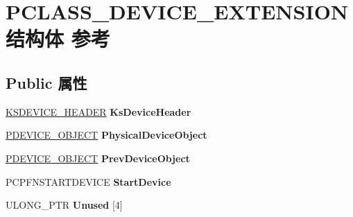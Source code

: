 \hypertarget{struct_p_c_l_a_s_s___d_e_v_i_c_e___e_x_t_e_n_s_i_o_n}{}\section{P\+C\+L\+A\+S\+S\+\_\+\+D\+E\+V\+I\+C\+E\+\_\+\+E\+X\+T\+E\+N\+S\+I\+O\+N结构体 参考}
\label{struct_p_c_l_a_s_s___d_e_v_i_c_e___e_x_t_e_n_s_i_o_n}
\subsection*{Public 属性}
\begin{DoxyCompactItemize}
\item 
\mbox{\label{struct_p_c_l_a_s_s___d_e_v_i_c_e___e_x_t_e_n_s_i_o_n_a088d32e2187f671bfe5e1c3013eb275b}} 
\hyperlink{interfacevoid}{K\+S\+D\+E\+V\+I\+C\+E\+\_\+\+H\+E\+A\+D\+ER} {\bfseries Ks\+Device\+Header}
\item 
\mbox{\label{struct_p_c_l_a_s_s___d_e_v_i_c_e___e_x_t_e_n_s_i_o_n_a1d6776c153eeffa6d287fc9c3e2117b2}} 
\hyperlink{struct___d_e_v_i_c_e___o_b_j_e_c_t}{P\+D\+E\+V\+I\+C\+E\+\_\+\+O\+B\+J\+E\+CT} {\bfseries Physical\+Device\+Object}
\item 
\mbox{\label{struct_p_c_l_a_s_s___d_e_v_i_c_e___e_x_t_e_n_s_i_o_n_a4721b969e8e48dedfc5940150492cd50}} 
\hyperlink{struct___d_e_v_i_c_e___o_b_j_e_c_t}{P\+D\+E\+V\+I\+C\+E\+\_\+\+O\+B\+J\+E\+CT} {\bfseries Prev\+Device\+Object}
\item 
\mbox{\label{struct_p_c_l_a_s_s___d_e_v_i_c_e___e_x_t_e_n_s_i_o_n_ad57a5bb8c016d4282b91305ea8607515}} 
P\+C\+P\+F\+N\+S\+T\+A\+R\+T\+D\+E\+V\+I\+CE {\bfseries Start\+Device}
\item 
\mbox{\label{struct_p_c_l_a_s_s___d_e_v_i_c_e___e_x_t_e_n_s_i_o_n_a51281e194edf4b44f9aff045fa6ee338}} 
U\+L\+O\+N\+G\+\_\+\+P\+TR {\bfseries Unused} \mbox{[}4\mbox{]}
\item 
\mbox{\label{struct_p_c_l_a_s_s___d_e_v_i_c_e___e_x_t_e_n_s_i_o_n_a4cb3f284a45800094589ca781a52b9cf}} 

\end{DoxyCompactItemize}
